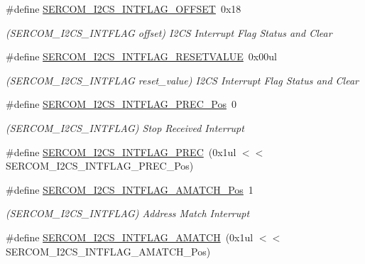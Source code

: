 \begin{DoxyCompactItemize}
\#define \mbox{\hyperlink{group___s_a_m_d21___s_e_r_c_o_m_gad9c846981d24d8d0c070acc9bf92faeb}{S\+E\+R\+C\+O\+M\+\_\+\+I2\+C\+S\+\_\+\+I\+N\+T\+F\+L\+A\+G\+\_\+\+O\+F\+F\+S\+ET}}~0x18
\begin{DoxyCompactList}\small\item\em (S\+E\+R\+C\+O\+M\+\_\+\+I2\+C\+S\+\_\+\+I\+N\+T\+F\+L\+AG offset) I2\+CS Interrupt Flag Status and Clear \end{DoxyCompactList}\item 
\#define \mbox{\hyperlink{group___s_a_m_d21___s_e_r_c_o_m_ga260614203fbaa36e1c30255bdc658541}{S\+E\+R\+C\+O\+M\+\_\+\+I2\+C\+S\+\_\+\+I\+N\+T\+F\+L\+A\+G\+\_\+\+R\+E\+S\+E\+T\+V\+A\+L\+UE}}~0x00ul
\begin{DoxyCompactList}\small\item\em (S\+E\+R\+C\+O\+M\+\_\+\+I2\+C\+S\+\_\+\+I\+N\+T\+F\+L\+AG reset\+\_\+value) I2\+CS Interrupt Flag Status and Clear \end{DoxyCompactList}\item 
\#define \mbox{\hyperlink{group___s_a_m_d21___s_e_r_c_o_m_gad0857b3c502af02c43f8309acaccfc64}{S\+E\+R\+C\+O\+M\+\_\+\+I2\+C\+S\+\_\+\+I\+N\+T\+F\+L\+A\+G\+\_\+\+P\+R\+E\+C\+\_\+\+Pos}}~0
\begin{DoxyCompactList}\small\item\em (S\+E\+R\+C\+O\+M\+\_\+\+I2\+C\+S\+\_\+\+I\+N\+T\+F\+L\+AG) Stop Received Interrupt \end{DoxyCompactList}\item 
\#define \mbox{\hyperlink{group___s_a_m_d21___s_e_r_c_o_m_ga3767432df5b297cb7b2538522a4f5118}{S\+E\+R\+C\+O\+M\+\_\+\+I2\+C\+S\+\_\+\+I\+N\+T\+F\+L\+A\+G\+\_\+\+P\+R\+EC}}~(0x1ul $<$$<$ S\+E\+R\+C\+O\+M\+\_\+\+I2\+C\+S\+\_\+\+I\+N\+T\+F\+L\+A\+G\+\_\+\+P\+R\+E\+C\+\_\+\+Pos)
\item 
\#define \mbox{\hyperlink{group___s_a_m_d21___s_e_r_c_o_m_gabac003794933f8d389693baf72e67952}{S\+E\+R\+C\+O\+M\+\_\+\+I2\+C\+S\+\_\+\+I\+N\+T\+F\+L\+A\+G\+\_\+\+A\+M\+A\+T\+C\+H\+\_\+\+Pos}}~1
\begin{DoxyCompactList}\small\item\em (S\+E\+R\+C\+O\+M\+\_\+\+I2\+C\+S\+\_\+\+I\+N\+T\+F\+L\+AG) Address Match Interrupt \end{DoxyCompactList}\item 
\#define \mbox{\hyperlink{group___s_a_m_d21___s_e_r_c_o_m_ga76a79112f808d4344ba6066542d239d0}{S\+E\+R\+C\+O\+M\+\_\+\+I2\+C\+S\+\_\+\+I\+N\+T\+F\+L\+A\+G\+\_\+\+A\+M\+A\+T\+CH}}~(0x1ul $<$$<$ S\+E\+R\+C\+O\+M\+\_\+\+I2\+C\+S\+\_\+\+I\+N\+T\+F\+L\+A\+G\+\_\+\+A\+M\+A\+T\+C\+H\+\_\+\+Pos)

\end{DoxyCompactItemize}
